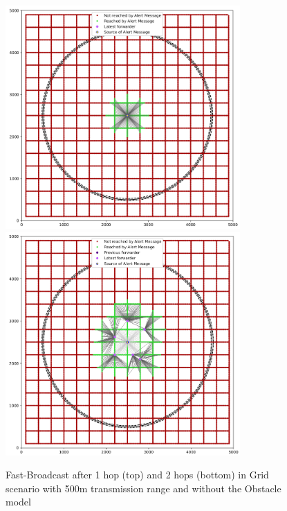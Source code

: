		\begin{figure}[H]
			\centering
			\includegraphics[width=0.8\textwidth]{immagini/grid-300/b0/fb-1hop}
			\includegraphics[width=0.8\textwidth]{immagini/grid-300/b0/fb-2hop}
			\caption{Fast-Broadcast after 1 hop (top) and 2 hops (bottom) in Grid scenario with 500m transmission range and without the Obstacle model}
			\label{fig:fb-b0-grid-transmission} 
		\end{figure}
		

